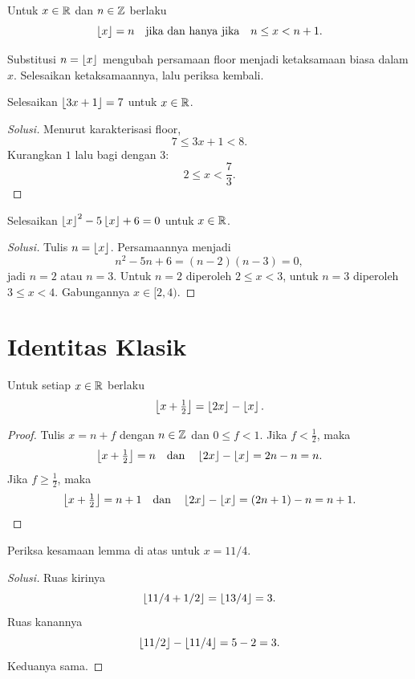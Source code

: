 \documentclass[12pt]{scrartcl}
\begin{document}
\begin{theorem}
Untuk $x \in \mathbb R$ dan $n \in \mathbb Z$ berlaku
\[ \left\lfloor x \right\rfloor = n \quad\text{jika dan hanya jika}\quad n \le x < n + 1. \]
\end{theorem}

Substitusi $n = \left\lfloor x \right\rfloor$ mengubah persamaan floor menjadi
ketaksamaan biasa dalam $x$. Selesaikan ketaksamaannya, lalu periksa kembali.

\begin{example}
Selesaikan $\left\lfloor 3x + 1 \right\rfloor = 7$ untuk $x \in \mathbb R$.
\end{example}
\begin{proof}[Solusi]
Menurut karakterisasi floor,
\[ 7 \le 3x + 1 < 8. \]
Kurangkan $1$ lalu bagi dengan $3$:
\[ 2 \le x < \frac{7}{3}. \]
\end{proof}

\begin{example}
Selesaikan $\left\lfloor x \right\rfloor^2 - 5\left\lfloor x \right\rfloor + 6 = 0$ untuk $x \in \mathbb R$.
\end{example}
\begin{proof}[Solusi]
Tulis $n = \left\lfloor x \right\rfloor$. Persamaannya menjadi
\[ n^2 - 5n + 6 = (n - 2)(n - 3) = 0, \]
jadi $n = 2$ atau $n = 3$.
Untuk $n = 2$ diperoleh $2 \le x < 3$,
untuk $n = 3$ diperoleh $3 \le x < 4$.
Gabungannya $x \in [2, 4)$.
\end{proof}

\section{Identitas Klasik}

\begin{lemma}
Untuk setiap $x \in \mathbb R$ berlaku
\[ \left\lfloor x + \tfrac12 \right\rfloor = \left\lfloor 2x \right\rfloor - \left\lfloor x \right\rfloor. \]
\end{lemma}
\begin{proof}
Tulis $x = n + f$ dengan $n \in \mathbb Z$ dan $0 \le f < 1$.
Jika $f < \frac12$, maka
\[ \left\lfloor x + \tfrac12 \right\rfloor = n
\quad\text{dan}\quad
\left\lfloor 2x \right\rfloor - \left\lfloor x \right\rfloor = 2n - n = n. \]
Jika $f \ge \frac12$, maka
\[ \left\lfloor x + \tfrac12 \right\rfloor = n + 1
\quad\text{dan}\quad
\left\lfloor 2x \right\rfloor - \left\lfloor x \right\rfloor = (2n + 1) - n = n + 1. \]
\end{proof}

\begin{example}
Periksa kesamaan lemma di atas untuk $x = 11/4$.
\end{example}
\begin{proof}[Solusi]
Ruas kirinya
\[ \left\lfloor 11/4 + 1/2 \right\rfloor = \left\lfloor 13/4 \right\rfloor = 3. \]
Ruas kanannya
\[ \left\lfloor 11/2 \right\rfloor - \left\lfloor 11/4 \right\rfloor = 5 - 2 = 3. \]
Keduanya sama.
\end{proof}
\end{document}
